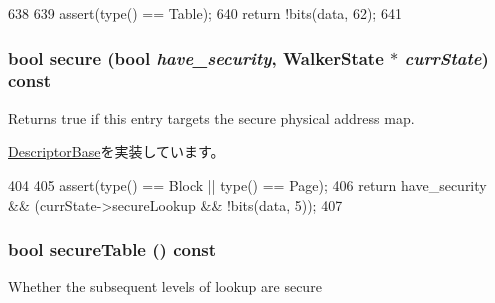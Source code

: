 \begin{DoxyCode}
638         {
639             assert(type() == Table);
640             return !bits(data, 62);
641         }
\end{DoxyCode}
\hypertarget{classArmISA_1_1TableWalker_1_1LongDescriptor_a183500f0404847b8d9ea66ef3cba6ca5}{
\subsubsection[{secure}]{\setlength{\rightskip}{0pt plus 5cm}bool secure (bool {\em have\_\-security}, \/  {\bf WalkerState} $\ast$ {\em currState}) const}}
\label{classArmISA_1_1TableWalker_1_1LongDescriptor_a183500f0404847b8d9ea66ef3cba6ca5}
Returns true if this entry targets the secure physical address map. 

\hyperlink{classArmISA_1_1TableWalker_1_1DescriptorBase_ab436e8aede9276b99fb2e8eac6d784a3}{DescriptorBase}を実装しています。


\begin{DoxyCode}
404         {
405             assert(type() == Block || type() == Page);
406             return have_security && (currState->secureLookup && !bits(data, 5));
407         }
\end{DoxyCode}
\hypertarget{classArmISA_1_1TableWalker_1_1LongDescriptor_aadb8f0e48c9256e28618be47ef61f681}{
\subsubsection[{secureTable}]{\setlength{\rightskip}{0pt plus 5cm}bool secureTable () const}}
\label{classArmISA_1_1TableWalker_1_1LongDescriptor_aadb8f0e48c9256e28618be47ef61f681}
Whether the subsequent levels of lookup are secure 


